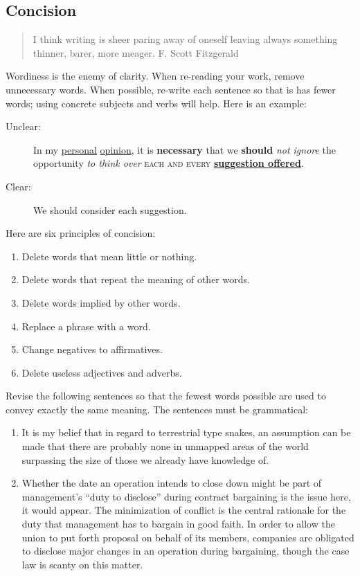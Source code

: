 \documentclass[10pt, oneside]{article}
\begin{document}
\subsection{Concision} 
\begin{verse}
 I think writing is sheer paring away of oneself leaving always something thinner, barer, more meager.
F. Scott Fitzgerald
\end{verse}


\noindent Wordiness is the enemy of clarity. When re-reading your work, remove unnecessary words. When possible, re-write each sentence so that is has fewer words; using concrete subjects and verbs will help. Here is an example: 

\begin{description} 
\item[Unclear:] In my \underline{personal} \underline{opinion}, it is \textbf{necessary} that we \textbf{should} \emph{not ignore} the opportunity \emph{to think over} \textsc{each and every} \textbf{\underline{suggestion offered}}.
\item[Clear:] We should consider each suggestion.
\end{description}

Here are six principles of concision: 

\begin{enumerate}
\item Delete words that mean little or nothing.
\item Delete words that repeat the meaning of other words. 
\item Delete words implied by other words.
\item  Replace a phrase with a word.
\item Change negatives to affirmatives.
\item Delete useless adjectives and adverbs.
\end{enumerate}

 Revise the following sentences so that the fewest words possible are used to convey exactly the same meaning. The sentences must be grammatical: 

\begin{enumerate}
\item It is my belief that in regard to terrestrial type snakes, an assumption can be made that there are probably none in unmapped areas of the world surpassing the size of those we already have knowledge of. \vspace{20mm}


\item Whether the date an operation intends to close down might be part of management's ``duty to disclose'' during contract bargaining is the issue here, it would appear. The minimization of conflict is the central rationale for the duty that management has to bargain in good faith. In order to allow the union to put forth proposal on behalf of its members, companies are obligated to disclose major changes in an operation during bargaining, though the case law is scanty on this matter. \vspace{20mm}

\end{enumerate}
\end{document}

